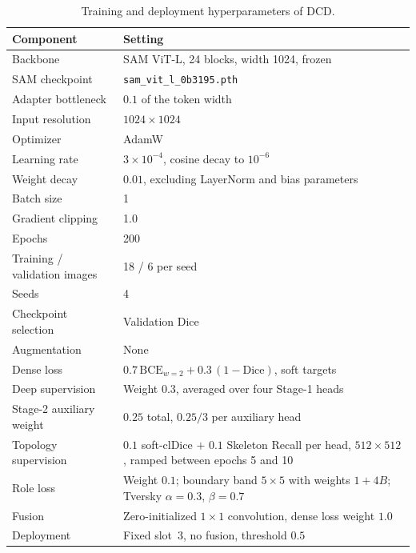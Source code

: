\begin{table}[t]
\centering
\caption{Training and deployment hyperparameters of DCD.}
\label{tab:supp_hyper}
\small
\begin{tabular}{@{}ll@{}}
\toprule
Component & Setting \\
\midrule
Backbone & SAM ViT-L, 24 blocks, width 1024, frozen \\
SAM checkpoint & \texttt{sam\_vit\_l\_0b3195.pth} \\
Adapter bottleneck & $0.1$ of the token width \\
Input resolution & $1024\times1024$ \\
Optimizer & AdamW \\
Learning rate & $3\times10^{-4}$, cosine decay to $10^{-6}$ \\
Weight decay & $0.01$, excluding LayerNorm and bias parameters \\
Batch size & 1 \\
Gradient clipping & 1.0 \\
Epochs & 200 \\
Training / validation images & 18 / 6 per seed \\
Seeds & 4 \\
Checkpoint selection & Validation Dice \\
Augmentation & None \\
Dense loss & $0.7\,\mathrm{BCE}_{w=2}+0.3\,(1-\mathrm{Dice})$, soft targets \\
Deep supervision & Weight $0.3$, averaged over four Stage-1 heads \\
Stage-2 auxiliary weight & $0.25$ total, $0.25/3$ per auxiliary head \\
Topology supervision & $0.1$ soft-clDice $+$ $0.1$ Skeleton Recall per head, $512\times512$, ramped between epochs 5 and 10 \\
Role loss & Weight $0.1$; boundary band $5\times5$ with weights $1+4B$; Tversky $\alpha=0.3$, $\beta=0.7$ \\
Fusion & Zero-initialized $1\times1$ convolution, dense loss weight $1.0$ \\
Deployment & Fixed slot~3, no fusion, threshold $0.5$ \\
\bottomrule
\end{tabular}
\end{table}
